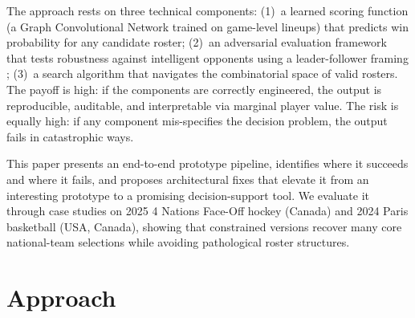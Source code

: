 \documentclass[12pt,letterpaper]{article}
\begin{document}
The approach rests on three technical components: (1)~a learned
scoring function (a Graph Convolutional Network trained on game-level
lineups) that predicts win probability for any candidate roster;
(2)~an adversarial evaluation framework that tests robustness against
intelligent opponents using a leader-follower framing
\citep{conitzer2006commit}; (3)~a search algorithm that navigates the
combinatorial space of valid rosters.
The payoff is high: if the components are correctly engineered, the
output is reproducible, auditable, and interpretable via marginal player
value.
The risk is equally high: if any component mis-specifies the decision
problem, the output fails in catastrophic ways.

This paper presents an end-to-end prototype pipeline, identifies where
it succeeds and where it fails, and proposes architectural fixes that
elevate it from an interesting prototype to a promising decision-support
tool.
We evaluate it through case studies on 2025 4 Nations Face-Off hockey
(Canada) and 2024 Paris basketball (USA, Canada), showing that
constrained versions recover many core national-team selections while
avoiding pathological roster structures.

\section{Approach}
\label{sec:approach}
\end{document}
